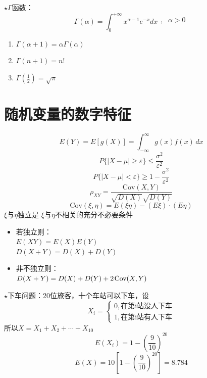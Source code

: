 \documentclass{article}
\begin{document}
$\star \Gamma$函数：
\[\Gamma(\alpha)=\int_{0}^{+\infty}x^{\alpha-1}e^{-x}dx\begin{matrix},&\alpha>0\\\end{matrix}\]
\begin{enumerate}
    \item $\Gamma(\alpha+1)=\alpha\Gamma(\alpha)$
    \item $\Gamma(n+1)=n!$
    \item $\Gamma(\frac{1}{2})=\sqrt\pi$
\end{enumerate}
\clearpage

\section*{\center\Huge 随机变量的数字特征}

    \[E(Y)=E[g(X)]=\int_{-\infty}^{\infty} g(x)f(x)  \,dx \]
\[P\{|X- \mu | \geq \varepsilon\}\leq \frac{\sigma ^2}{\varepsilon ^2} \]
\[P\{|X-\mu|<\varepsilon\}\geq 1-\frac{\sigma ^2}{\varepsilon ^2}\]
\[\rho_{XY} =\frac{\text{Cov}(X,Y)}{\sqrt{D(X)}\sqrt{D(Y)}}\]
\[\text{Cov}(\xi,\eta)=E(\xi\eta)-(E\xi)\cdot(E\eta)\]
$\xi $与$\eta$独立是 $\xi $与$\eta$不相关的充分不必要条件

\begin{itemize}
    \item 若独立则：\\
    $E(XY)=E(X)E(Y)$\\
    $D(X+Y)=D(X)+D(Y)$
    \item 非不独立则：\\
    $D(X+Y)=D(X)+D(Y)+2\hspace*{1pt}\text{Cov}(X,Y)$
\end{itemize}


$\star$下车问题：20位旅客，十个车站可以下车，设
\[X_i=\begin{cases}
    0,\text{在第i站没人下车}\\
    1,\text{在第i站有人下车}
\end{cases}\]
所以$X=X_1+X_2+\cdots +X_{10}$
\[E(X_i)=1-{(\frac{9}{10})}^{20}\]
\[E(X)=10[1-{(\frac{9}{10})}^{20}]=8.784\]
\end{document}
